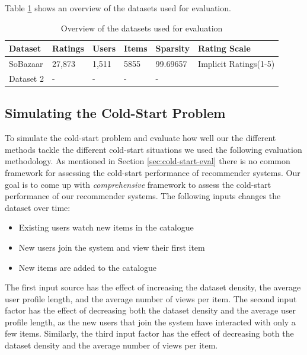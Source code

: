 Table \ref{table:datasets} shows an overview of the datasets used for evaluation.


\begin{table}[H]
    \centering
    \begin{tabular}{l l l l l l }
    \toprule
	Dataset			& 	Ratings 	& 	Users	& 	Items 	& 	Sparsity	& Rating Scale 				\\ \midrule
	SoBazaar 		& 	27,873  	& 	1,511	&	5855	&	99.69657	& Implicit Ratings(1-5)		\\ 
	Dataset 2 		& 	-  			& 	-		&	-		&	-			&							\\
	\bottomrule
    \end{tabular}
    \caption [Overview of the datasets used for evaluation]{Overview of the datasets used for evaluation}
    \label{table:datasets}
\end{table}

\subsection{Simulating the Cold-Start Problem}

To simulate the cold-start problem and evaluate how well our the different
methods tackle the different cold-start situations we used the following
evaluation methodology. As mentioned in Section \ref{sec:cold-start-eval} there is
no common framework for assessing the cold-start performance of recommender systems.
Our goal is to come up with \emph{comprehensive} framework to assess the cold-start
performance of our recommender systems. The following inputs changes the dataset over time:

\begin{itemize}
	\item 	Existing users watch new items in the catalogue
	\item	New users join the system and view their first item
	\item	New items are added to the catalogue
\end{itemize}

The first input source has the effect of increasing the dataset density, the average user
profile length, and the average number of views per item. The second input factor has
the effect of decreasing both the dataset density and the average user profile length,
as the new users that join the system have interacted with only a few items. Similarly, the third input
factor has the effect of decreasing both the dataset density and the average number of
views per item.


